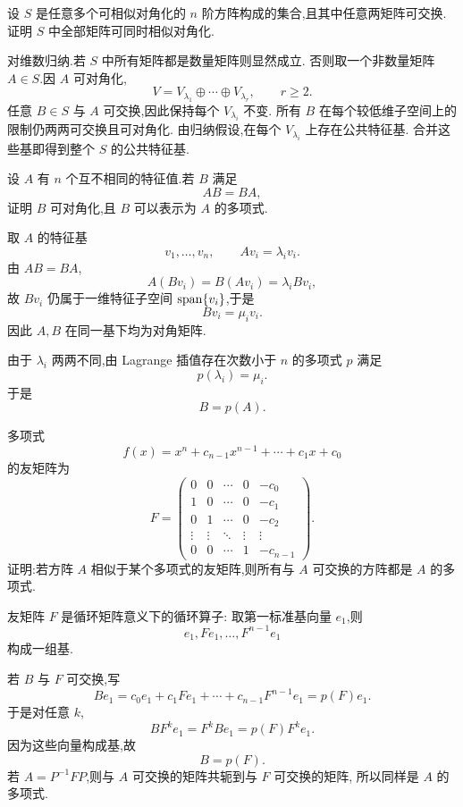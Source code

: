 \begin{example}[\markstar]
设 $S$ 是任意多个可相似对角化的 $n$ 阶方阵构成的集合,且其中任意两矩阵可交换.
证明 $S$ 中全部矩阵可同时相似对角化.
\end{example}
\exampleblank

\begin{solution}
对维数归纳.若 $S$ 中所有矩阵都是数量矩阵则显然成立.
否则取一个非数量矩阵 $A\in S$.因 $A$ 可对角化,
\[
V=V_{\lambda_1}\oplus\cdots\oplus V_{\lambda_r},
\qquad r\geq2.
\]
任意 $B\in S$ 与 $A$ 可交换,因此保持每个 $V_{\lambda_i}$ 不变.
所有 $B$ 在每个较低维子空间上的限制仍两两可交换且可对角化.
由归纳假设,在每个 $V_{\lambda_i}$ 上存在公共特征基.
合并这些基即得到整个 $S$ 的公共特征基.
\end{solution}


\begin{example}
设 $A$ 有 $n$ 个互不相同的特征值.若 $B$ 满足
\[
AB=BA,
\]
证明 $B$ 可对角化,且 $B$ 可以表示为 $A$ 的多项式.
\end{example}
\exampleblank

\begin{solution}
取 $A$ 的特征基
\[
v_1,\ldots,v_n,
\qquad
Av_i=\lambda_i v_i.
\]
由 $AB=BA$,
\[
A(Bv_i)=B(Av_i)=\lambda_iBv_i,
\]
故 $Bv_i$ 仍属于一维特征子空间 $\operatorname{span}\{v_i\}$,于是
\[
Bv_i=\mu_i v_i.
\]
因此 $A,B$ 在同一基下均为对角矩阵.

由于 $\lambda_i$ 两两不同,由 Lagrange 插值存在次数小于 $n$ 的多项式 $p$ 满足
\[
p(\lambda_i)=\mu_i.
\]
于是
\[
\boxed{B=p(A)}.
\]
\end{solution}


\begin{example}
多项式
\[
f(x)=x^n+c_{n-1}x^{n-1}+\cdots+c_1x+c_0
\]
的友矩阵为
\[
F=
\begin{pmatrix}
0&0&\cdots&0&-c_0\\
1&0&\cdots&0&-c_1\\
0&1&\cdots&0&-c_2\\
\vdots&\vdots&\ddots&\vdots&\vdots\\
0&0&\cdots&1&-c_{n-1}
\end{pmatrix}.
\]
证明:若方阵 $A$ 相似于某个多项式的友矩阵,则所有与 $A$ 可交换的方阵都是 $A$ 的多项式.
\end{example}
\exampleblank

\begin{solution}
友矩阵 $F$ 是循环矩阵意义下的循环算子:
取第一标准基向量 $e_1$,则
\[
e_1,Fe_1,\ldots,F^{n-1}e_1
\]
构成一组基.

若 $B$ 与 $F$ 可交换,写
\[
Be_1=
c_0e_1+c_1Fe_1+\cdots+c_{n-1}F^{n-1}e_1
=
p(F)e_1.
\]
于是对任意 $k$,
\[
BF^ke_1
=
F^kBe_1
=
p(F)F^ke_1.
\]
因为这些向量构成基,故
\[
B=p(F).
\]
若 $A=P^{-1}FP$,则与 $A$ 可交换的矩阵共轭到与 $F$ 可交换的矩阵,
所以同样是 $A$ 的多项式.
\end{solution}


